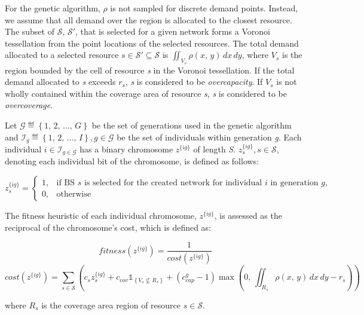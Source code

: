 \documentclass[onecolumn,draftcls]{IEEEtran}
\begin{document}
For the genetic algorithm, $\rho$ is not sampled for discrete demand points.  Instead, we assume that all demand over the region is allocated to the closest resource.  The subset of $\mathcal{S}$, $\mathcal{S}'$, that is selected for a given network forms a Voronoi tessellation from the point locations of the selected resources.  The total demand allocated to a selected resource $s \in \mathcal{S}' \subseteq \mathcal{S}$ is $\iint_{V_s} \rho\left(x,\, y\right) \,dx \,dy$, where $V_s$ is the region bounded by the cell of resource \textit{s} in the Voronoi tessellation.  If the total demand allocated to \textit{s} exceeds $r_s$, \textit{s} is considered to be \textit{overcapacity}.  If $V_s$ is not wholly contained within the coverage area of resource \textit{s}, \textit{s} is considered to be \textit{overcoverage}.

Let $\mathcal{G} \eqdef \left\{1,\, 2,\, \ldots,\, G\right\}$ be the set of generations used in the genetic algorithm and $\mathcal{I}_g \eqdef \left\{1,\, 2,\, \ldots,\, I\right\}, g \in \mathcal{G}$ be the set of individuals within generation \textit{g}.  Each individual $i \in \mathcal{I}_{g \in \mathcal{G}}$ has a binary chromosome $z^{\{ig\}}$ of length \textit{S}.  $z_s^{\{ig\}}, s \in \mathcal{S}$, denoting each individual bit of the chromosome, is defined as follows:

\[ z_s^{\{ig\}} =
	\begin{cases}
		1,& \text{if BS $s$ is selected for the created network for individual $i$ in generation $g$,}\\
		0,& \text{otherwise}
	\end{cases}
\]

The fitness heuristic of each individual chromosome, $z^{\{ig\}}$, is assessed as the reciprocal of the chromosome's cost, which is defined as:

\begin{equation} \label{eq:GAFit}
fitness\left(z^{\{ig\}}\right) = \frac{1}{cost\left(z^{\{ig\}}\right)}
\end{equation}
\begin{equation} \label{eq:GACost}
cost\left(z^{\{ig\}}\right) = \sum_{s \in \mathcal{S}} \left( c_s z_s^{\{ig\}} + c_{cov}  \mathbb{1}_{\left\{ V_s \nsubseteq R_s \right\}} + \left(c_{cap}^g - 1\right) \max\left( 0,\, \iint_{R_s} \rho\left(x,\, y\right)\, dx\, dy - r_s \right) \right)
\end{equation}

\noindent where $R_s$ is the coverage area region of resource $s \in \mathcal{S}$.
\end{document}
